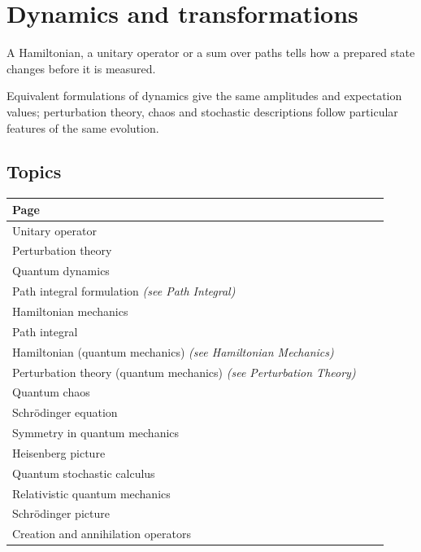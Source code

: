 \documentclass[11pt,oneside]{book}
\begin{document}
\chapter{Dynamics and transformations}

A Hamiltonian, a unitary operator or a sum over paths tells how a prepared state changes before it is measured.

Equivalent formulations of dynamics give the same amplitudes and expectation values; perturbation theory, chaos and stochastic descriptions follow particular features of the same evolution.

\section*{Topics}

\begin{longtable}{p{0.92\linewidth}}
\toprule
Page \\
\midrule
\endhead
{}\label{page:unitary-operator}Unitary operator \\
\label{page:perturbation-theory}Perturbation theory \\
\label{page:quantum-dynamics}Quantum dynamics \\
\label{page:path-integral-formulation}Path integral formulation \emph{(see Path Integral)} \\
\label{page:hamiltonian-mechanics}Hamiltonian mechanics \\
\label{page:path-integral}Path integral \\
\label{page:hamiltonian-quantum-mechanics}Hamiltonian (quantum mechanics) \emph{(see Hamiltonian Mechanics)} \\
\label{page:perturbation-theory-quantum-mechanics}Perturbation theory (quantum mechanics) \emph{(see Perturbation Theory)} \\
\label{page:quantum-chaos}Quantum chaos \\
\label{page:schr-dinger-equation}Schrödinger equation \\
\label{page:symmetry-in-quantum-mechanics}Symmetry in quantum mechanics \\
\label{page:heisenberg-picture}Heisenberg picture \\
\label{page:quantum-stochastic-calculus}Quantum stochastic calculus \\
\label{page:relativistic-quantum-mechanics}Relativistic quantum mechanics \\
\label{page:schr-dinger-picture}Schrödinger picture \\
\label{page:creation-and-annihilation-operators}Creation and annihilation operators \\
\bottomrule
\end{longtable}
\end{document}
